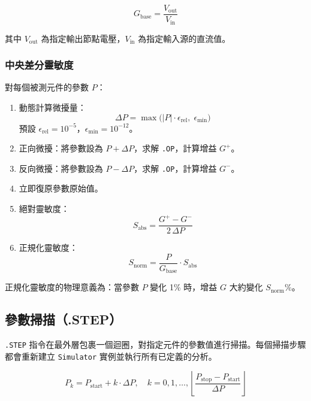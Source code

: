\documentclass[12pt,a4paper]{article}
\begin{document}
\begin{equation}
G_{\text{base}} = \frac{V_{\text{out}}}{V_{\text{in}}}
\end{equation}

\noindent 其中 $V_{\text{out}}$ 為指定輸出節點電壓，$V_{\text{in}}$ 為指定輸入源的直流值。

\subsubsection{中央差分靈敏度}

對每個被測元件的參數 $P$：

\begin{enumerate}
  \item 動態計算微擾量：
  \begin{equation}
  \Delta P = \max\bigl(|P| \cdot \epsilon_{\text{rel}},\; \epsilon_{\text{min}}\bigr)
  \end{equation}
  預設 $\epsilon_{\text{rel}} = 10^{-5}$，$\epsilon_{\text{min}} = 10^{-12}$。

  \item 正向微擾：將參數設為 $P + \Delta P$，求解 \texttt{.OP}，計算增益 $G^+$。
  \item 反向微擾：將參數設為 $P - \Delta P$，求解 \texttt{.OP}，計算增益 $G^-$。
  \item 立即復原參數原始值。

  \item 絕對靈敏度：
  \begin{equation}
  S_{\text{abs}} = \frac{G^+ - G^-}{2\,\Delta P}
  \end{equation}

  \item 正規化靈敏度：
  \begin{equation}
  S_{\text{norm}} = \frac{P}{G_{\text{base}}} \cdot S_{\text{abs}}
  \end{equation}
\end{enumerate}

正規化靈敏度的物理意義為：當參數 $P$ 變化 1\% 時，增益 $G$ 大約變化 $S_{\text{norm}}$\%。

\subsection{參數掃描（.STEP）}

\texttt{.STEP} 指令在最外層包裹一個迴圈，對指定元件的參數值進行掃描。每個掃描步驟都會重新建立 \texttt{Simulator} 實例並執行所有已定義的分析。

\begin{equation}
P_k = P_{\text{start}} + k \cdot \Delta P, \quad k = 0, 1, \ldots, \left\lfloor\frac{P_{\text{stop}} - P_{\text{start}}}{\Delta P}\right\rfloor
\end{equation}
\end{document}
